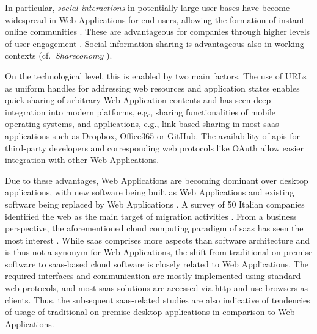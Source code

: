 In particular, \emph{social interactions} in potentially large user bases have become widespread in \glspl{Web Application} for end users, allowing the formation of instant online communities \autocite{Bressler2000OnlineCommunities}. These are advantageous for companies through higher levels of user engagement \autocite{Bressler2000OnlineCommunities}.
Social information sharing is advantageous also in working contexts (cf.~\emph{Shareconomy} \autocite{Bitkom2013Arbeit30}).

On the technological level, this is enabled by two main factors.
The use of URLs as uniform handles for addressing \Gls{web} resources and application states enables quick sharing of arbitrary \gls{Web Application} contents and has seen deep integration into modern platforms, e.g., sharing functionalities of mobile operating systems, and applications, e.g., link-based sharing in most \gls{saas} applications such as Dropbox, Office365 or GitHub.
The availability of \glspl{api} for third-party developers and corresponding \Gls{web} protocols like OAuth allow easier integration with other \glspl{Web Application}.

Due to these advantages, \glspl{Web Application} are becoming dominant over desktop applications, with new software being built as \glspl{Web Application} \autocite{BetterCloud2017SaaSWorkplace} and existing software being replaced by \glspl{Web Application} \autocite{Gartner2012SaaSSurvey}.
A survey of 50 Italian companies identified the \Gls{web} as the main target of migration activities \autocite{Torchiano2008ItalianSurvey}.
From a business perspective, the aforementioned cloud computing paradigm of \gls{saas} has seen the most interest \autocite{Statista2018SaaSStatistics}.
While \gls{saas} comprises more aspects than software architecture and is thus not a synonym for \glspl{Web Application}, the shift from traditional on-premise software to \gls{saas}-based cloud software is closely related to \glspl{Web Application}. The required interfaces and communication are mostly implemented using standard \Gls{web} protocols, and most \gls{saas} solutions are accessed via \gls{http} and use browsers as clients.
Thus, the subsequent \gls{saas}-related studies are also indicative of tendencies of usage of traditional on-premise desktop applications in comparison to \glspl{Web Application}.

